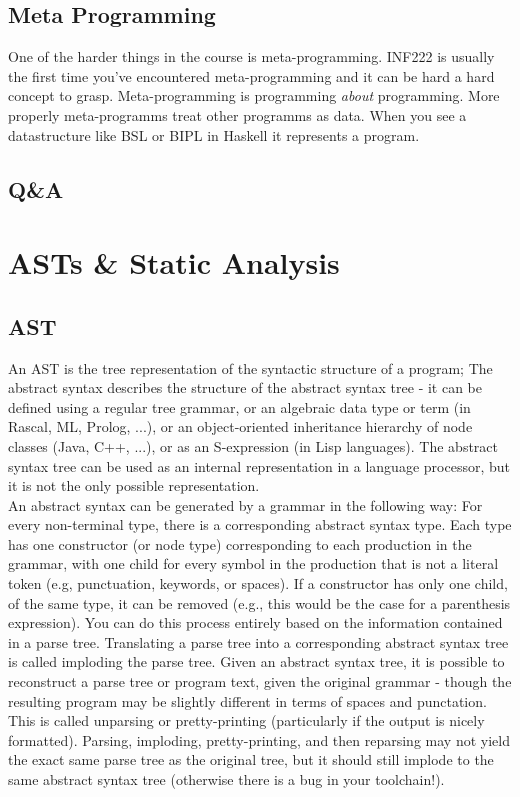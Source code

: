 \documentclass{article}
\begin{document}
    \subsection{Meta Programming}
    One of the harder things in the course is \gls{meta-programming}. INF222 is usually the first time you've encountered meta-programming and it can be hard a hard concept to grasp. 
    Meta-programming is programming \textit{about} programming. More properly meta-programms treat other programms as data. When you see a datastructure like \gls{BSL} or \gls{BIPL} in Haskell it
    represents a program.

    \subsection{Q\&A}

    \section{ASTs \& Static Analysis}
    \subsection{AST}
        An \gls{AST} is the tree representation of the syntactic structure of a program; The abstract syntax
        describes the structure of the abstract syntax tree - it can be defined using a
        regular tree grammar, or an algebraic data type or term (in Rascal, ML, Prolog,
        ...), or an object-oriented inheritance hierarchy of node classes (Java, C++, ...),
        or as an S-expression (in Lisp languages).
        The abstract syntax tree can be used as an internal representation in a language processor, 
        but it is not the only possible representation.\\
        An abstract syntax can be generated by a grammar in the following way:
        For every non-terminal type, there is a corresponding abstract syntax type.
        Each type has one constructor (or node type) corresponding to each production in the grammar, with one child for every symbol in the production that
        is not a literal token (e.g, punctuation, keywords, or spaces). If a constructor
        has only one child, of the same type, it can be removed (e.g., this would be
        the case for a parenthesis expression). You can do this process entirely based
        on the information contained in a parse tree. Translating a parse tree into a
        corresponding abstract syntax tree is called imploding the parse tree.
        Given an abstract syntax tree, it is possible to reconstruct a parse tree or program text, given the original grammar - though the resulting program may be
        slightly different in terms of spaces and punctation. This is called unparsing or
        pretty-printing (particularly if the output is nicely formatted). Parsing, imploding, pretty-printing, and then reparsing may not yield the exact same parse tree
        as the original tree, but it should still implode to the same abstract syntax tree (otherwise there is a bug in your toolchain!).
\end{document}
